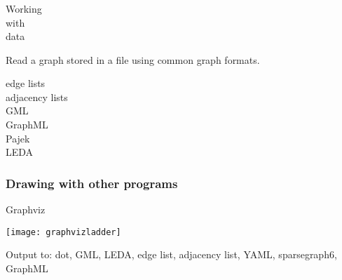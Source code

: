\begin{frame}
\frametitle{}
\begin{center}
{\fontsize{48}{55}\selectfont
{\color{title} Working\\
with\\
data\\}}
\end{center}
\end{frame}


\begin{frame}
 Read a graph stored in a file using common graph formats.
\begin{description}
\item [edge lists]
\item [adjacency lists]
\item [GML]
\item [GraphML]
\item [Pajek]
\item [LEDA]
\end{description}

\end{frame}




\begin{frame}[fragile]
\frametitle{Drawing with other programs}
\centerline{Graphviz}
\centerline{\texttt{[image: graphvizladder]}}

Output to: dot, GML, LEDA, edge list, adjacency list, YAML,
sparsegraph6, GraphML

\end{frame}
